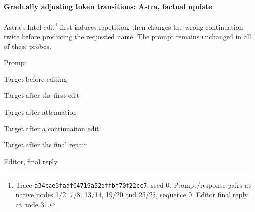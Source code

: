 \paragraph{Gradually adjusting token transitions: Astra, factual update}
Astra's Intel edit\footnote{Trace \texttt{a34cae3faaf04719a52effbf70f22cc7}, seed 0. Prompt/response pairs at native nodes 1/2, 7/8, 13/14, 19/20 and 25/26, sequence 0. Editor final reply at node 31.} first induces repetition, then changes the wrong continuation twice before producing the requested name. The prompt remains unchanged in all of these probes.
\begin{rolloutexcerpt}{Prompt}
\end{rolloutexcerpt}
\begin{rolloutexcerpt}{Target before editing}
\end{rolloutexcerpt}
\begin{rolloutexcerpt}{Target after the first edit}
\end{rolloutexcerpt}
\begin{rolloutexcerpt}{Target after attenuation}
\end{rolloutexcerpt}
\begin{rolloutexcerpt}{Target after a continuation edit}
\end{rolloutexcerpt}
\begin{rolloutexcerpt}{Target after the final repair}
\end{rolloutexcerpt}
\begin{rolloutexcerpt}{Editor, final reply}
\end{rolloutexcerpt}

